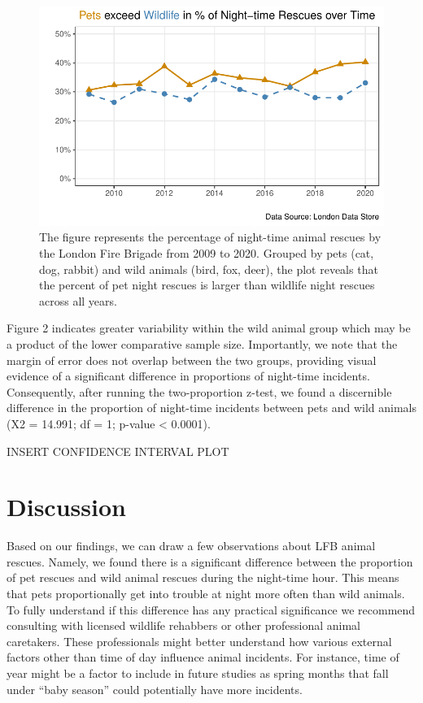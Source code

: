 \documentclass[
]{article}
\begin{document}
\begin{figure}[H]

{\centering \includegraphics{Final_Report_files/figure-pdf/fig-night-animal-1.pdf}

}

\caption{\label{fig-night-animal}The figure represents the percentage of
night-time animal rescues by the London Fire Brigade from 2009 to 2020.
Grouped by pets (cat, dog, rabbit) and wild animals (bird, fox, deer),
the plot reveals that the percent of pet night rescues is larger than
wildlife night rescues across all years.}

\end{figure}

Figure 2 indicates greater variability within the wild animal group
which may be a product of the lower comparative sample size.
Importantly, we note that the margin of error does not overlap between
the two groups, providing visual evidence of a significant difference in
proportions of night-time incidents. Consequently, after running the
two-proportion z-test, we found a discernible difference in the
proportion of night-time incidents between pets and wild animals (X2 =
14.991; df = 1; p-value \textless{} 0.0001).

INSERT CONFIDENCE INTERVAL PLOT

\hypertarget{discussion}{%
\section{Discussion}\label{discussion}}

Based on our findings, we can draw a few observations about LFB animal
rescues. Namely, we found there is a significant difference between the
proportion of pet rescues and wild animal rescues during the night-time
hour. This means that pets proportionally get into trouble at night more
often than wild animals. To fully understand if this difference has any
practical significance we recommend consulting with licensed wildlife
rehabbers or other professional animal caretakers. These professionals
might better understand how various external factors other than time of
day influence animal incidents. For instance, time of year might be a
factor to include in future studies as spring months that fall under
``baby season'' could potentially have more incidents.
\end{document}

